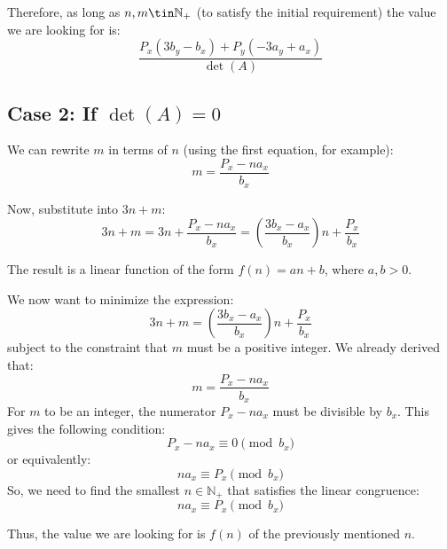 \documentclass{article}
\newcommand{\intpos}{\mathbb{N}_+}
\begin{document}
Therefore, as long as \( n, m \tin \intpos \) (to satisfy the initial requirement) the value we are looking for is:
\[
  \frac{P_x(3b_y - b_x) + P_y(-3a_y + a_x)}{\det(A)}
\]

\subsection*{Case 2: If \( \det(A) = 0 \)}

We can rewrite \( m \) in terms of \( n \) (using the first equation, for example):
\[
  m = \frac{P_x - n a_x}{b_x}
\]

Now, substitute into \( 3n + m \):
\[
  3n + m = 3n + \frac{P_x - n a_x}{b_x} = \left( \frac{3 b_x - a_x}{b_x} \right) n + \frac{P_x}{b_x}
\]

The result is a linear function of the form \( f(n) = an + b \), where \( a, b > 0 \).

We now want to minimize the expression:
\[
3n + m = \left( \frac{3 b_x - a_x}{b_x} \right) n + \frac{P_x}{b_x}
\]
subject to the constraint that \( m \) must be a positive integer. We already derived that:
\[
m = \frac{P_x - n a_x}{b_x}
\]
For \( m \) to be an integer, the numerator \( P_x - n a_x \) must be divisible by \( b_x \). This gives the following condition:
\[
P_x - n a_x \equiv 0 \pmod{b_x}
\]
or equivalently:
\[
n a_x \equiv P_x \pmod{b_x}
\]
So, we need to find the smallest \( n \in \intpos \) that satisfies the linear congruence:
\[
n a_x \equiv P_x \pmod{b_x}
\]

Thus, the value we are looking for is \( f(n) \) of the previously mentioned \( n \).
\end{document}
